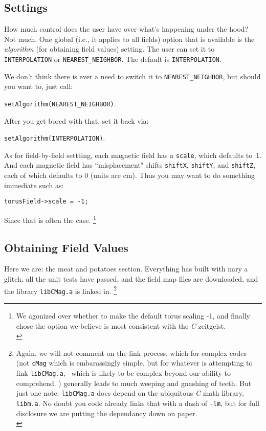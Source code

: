 \documentclass{article}
\begin{document}
\subsection{Settings}
How much control does the user have over what's happening under the hood? Not much. One global (i.e., it applies to all fields) option that is available is the \textit{algorithm} (for obtaining field values) setting. The user can set it to \texttt{INTERPOLATION} or \texttt{NEAREST\_NEIGHBOR}. The default is \texttt{INTERPOLATION}. 

We don't think there is ever a need to switch it to \texttt{NEAREST\_NEIGHBOR}, but should you want to, just call:

\texttt{setAlgorithm(NEAREST\_NEIGHBOR)}. 

After you get bored with that, set it back via: 

\texttt{setAlgorithm(INTERPOLATION)}.

As for field-by-field  settting, each magnetic field has a \texttt{scale}, which defaults to\ 1. And each magnetic field has ``misplacement" shifts \texttt{shiftX}, \texttt{shiftY}, and \texttt{shiftZ}, each of which defaults to 0 (units are cm). Thus you may want to do something immediate such as:
 \begin{verbatim} 
torusField->scale = -1;
\end{verbatim}
Since that is often the case. \footnote{We agonized over whether to make the default torus scaling -1, and finally chose the option we believe is most consistent with the \textit{C} zeitgeist.\\}


\subsection{Obtaining Field Values}
Here we are: the meat and potatoes section. Everything has built with nary a glitch, all the unit tests have passed,  and the field map files are downloaded, and the library \texttt{libCMag.a} is linked in. \footnote{Again, we will not comment on the link process, which for complex codes (not \texttt{cMag} which is embarassingly simple, but for whatever is attempting to link \texttt{libCMag.a}, --which is likely to be complex beyond our ability to comprehend. ) generally leads to much weeping and gnashing of teeth. But just one note: \texttt{libCMag.a} does depend on the ubiquitous \textit{C} math library, \texttt{libm.a}. No doubt you code already links that with a dash of \texttt{-lm}, but for full disclosure we are putting the dependancy down on paper.\\}
\end{document}
